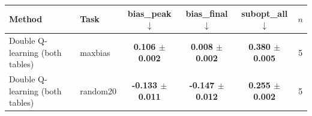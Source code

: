 \begin{tabular}{llcccc}
\toprule
Method & Task & bias\_peak $\downarrow$ & bias\_final $\downarrow$ & subopt\_all $\downarrow$ & $n$ \\
\midrule
Double Q-learning (both tables) & maxbias & \textbf{0.106 $\pm$ 0.002} & \textbf{0.008 $\pm$ 0.002} & \textbf{0.380 $\pm$ 0.005} & 5 \\
\midrule
Double Q-learning (both tables) & random20 & \textbf{-0.133 $\pm$ 0.011} & \textbf{-0.147 $\pm$ 0.012} & \textbf{0.255 $\pm$ 0.002} & 5 \\
\bottomrule
\end{tabular}

